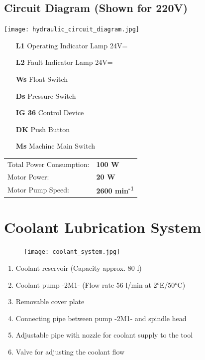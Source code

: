 \vspace{2cm}

\subsection*{Circuit Diagram (Shown for 220V)}

\begin{minipage}{0.65\textwidth}
    \texttt{[image: hydraulic\_circuit\_diagram.jpg]}
\end{minipage}%
\begin{minipage}{0.35\textwidth}
    \begin{itemize}
        \item[\textbf{L1}] Operating Indicator Lamp 24V=
        \item[\textbf{L2}] Fault Indicator Lamp 24V=
        \item[\textbf{Ws}] Float Switch
        \item[\textbf{Ds}] Pressure Switch
        \item[\textbf{IG 36}] Control Device
        \item[\textbf{DK}] Push Button
        \item[\textbf{Ms}] Machine Main Switch
    \end{itemize}
\end{minipage}

\vspace{1cm}

\noindent
\begin{tabular}{ll}
    Total Power Consumption: & \textbf{100 W} \\
    Motor Power: & \textbf{20 W} \\
    Motor Pump Speed: & \textbf{2600 min\textsuperscript{-1}}
\end{tabular}

\section{Coolant Lubrication System}

\setcounter{section}{22}

\begin{figure}[h]
    \centering
    \texttt{[image: coolant\_system.jpg]}
\end{figure}

\noindent
\begin{enumerate}
    \item Coolant reservoir (Capacity approx. 80 l)\footnotemark
    \item Coolant pump -2M1- (Flow rate 56 l/min at 2°E/50°C)\footnotemark
    \item Removable cover plate
    \item Connecting pipe between pump -2M1- and spindle head
    \item Adjustable pipe with nozzle for coolant supply to the tool\footnotemark
    \item Valve for adjusting the coolant flow
\end{enumerate}

